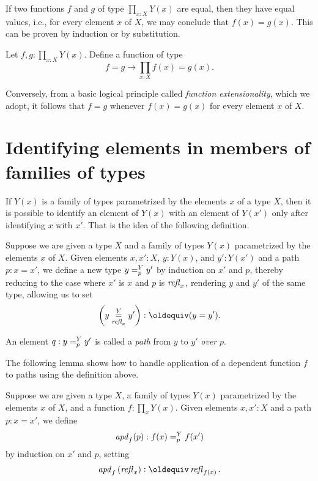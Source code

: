 If two functions $f$ and $g$ of type $\prod_{x:X} Y(x)$ are equal, 
then they have equal values, i.e., for every element $x$ of $X$, 
we may conclude that $f(x) = g(x)$.
This can be proven by induction or by substitution.
\begin{xca}\label{happly}
Let $f,g:\prod_{x:X} Y(x)$. Define a function of type 
\[ 
f=g \to \prod_{x:X} f(x)=g(x).
\] 
\end{xca}

Conversely, from a basic logical principle called {\em function extensionality}, which we adopt,
it follows that $f=g$ whenever $f(x) = g(x)$ for every element $x$ of $X$.

\section{Identifying elements in members of families of types}

If $Y(x)$ is a family of types parametrized by the elements $x$ of a type $X$, then it is possible to identify an element of $Y(x)$ with an
element of $Y(x')$ only after identifying $x$ with $x'$.  That is the idea of the following definition.

\begin{definition}\label{def:pathsoverpaths}
  Suppose we are given a type $X$ and a family of types $Y(x)$ parametrized by the elements $x$ of $X$.  Given elements $x,x':X$, $y:Y(x)$, and
  $y':Y(x')$ and a path $p : x = x'$, we define a new type $y =^{Y}_{p} y'$ by induction on $x'$ and $p$, thereby reducing to the case
  where $x'$ is $x$ and $p$ is $\mathop{{\it refl}_{x}}$,
  rendering $y$ and $y'$ of the same type,
  allowing us to set $$\left( \pathoverdisplay y Y {\refl x} {y'} \right) \defeq (y = y').$$
\end{definition}

An element $q : y =^{Y}_{p} y'$ is called a {\em path} from $y$ to $y'$ {\em over} $p$.

The following lemma shows how to handle application of a dependent function $f$ to paths using the definition above.

\begin{definition}\label{def:apd}
  Suppose we are given a type $X$, a family of types $Y(x)$ parametrized by the elements $x$ of $X$, and a function $f:\prod_x Y(x)$.
  Given elements $x,x':X$ and a path $p : x = x'$, we define $$\mathop{{\it apd}_{f}}(p) : f(x) =^{Y}_{p} f(x')$$ by induction on $x'$ and $p$,
  setting $$\apd f {(\refl x)} \defeq \refl {f(x)}.$$
\end{definition}

